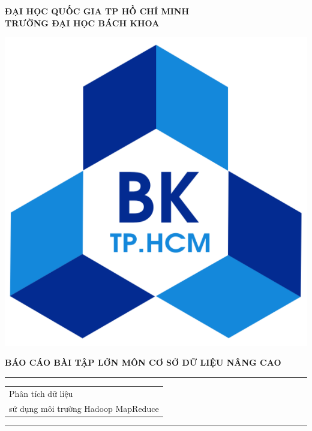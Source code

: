 \documentclass{hcmutarticle}
\begin{document}
	\thispagestyle{empty}
	\begin{center}
		\LARGE\bfseries ĐẠI HỌC QUỐC GIA TP HỒ CHÍ MINH \\
		TRƯỜNG ĐẠI HỌC BÁCH KHOA
	\end{center}
	
	\begin{center}
		\includegraphics[scale=0.2]{hcmut.pdf}\\[1cm]
	\end{center}
	
	\vspace{1cm}
	
	\begin{center}
		\Large \bfseries BÁO CÁO BÀI TẬP LỚN MÔN CƠ SỞ DỮ LIỆU NÂNG CAO\\[0.5cm]
	\end{center}
	\rule{\textwidth}{1pt}
	\vspace{2pt}
	\begin{center}
		\Huge
		\begin{tabular}{@{}l}
			Phân tích dữ liệu\\ sử dụng môi trường Hadoop MapReduce
		\end{tabular}
	\end{center}
	\rule{\textwidth}{1pt}\\[1cm]
	
\end{document}
